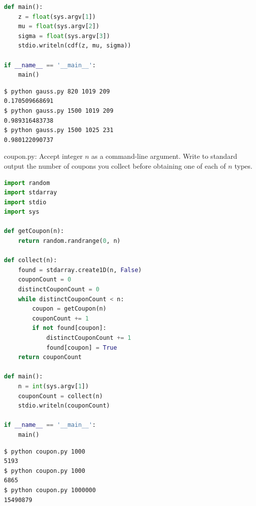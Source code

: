 \documentclass[8pt,a4paper,compress,handout]{beamer}
\begin{document}
\begin{frame}[fragile]
\begin{lstlisting}[language=Python]
def main():
    z = float(sys.argv[1])
    mu = float(sys.argv[2])
    sigma = float(sys.argv[3])
    stdio.writeln(cdf(z, mu, sigma))

if __name__ == '__main__':
    main()
\end{lstlisting}

\begin{lstlisting}[language={}]
$ python gauss.py 820 1019 209
0.170509668691
$ python gauss.py 1500 1019 209
0.989316483738
$ python gauss.py 1500 1025 231
0.980122090737
\end{lstlisting}
\end{frame}

\begin{frame}[fragile]
\begin{framed}
\tiny coupon.py: Accept integer $n$ as a command-line argument. Write to standard output the number of coupons you collect before obtaining one of each of $n$ types.
\end{framed}

\begin{lstlisting}[language=Python]
import random
import stdarray
import stdio
import sys

def getCoupon(n):
    return random.randrange(0, n)

def collect(n):
    found = stdarray.create1D(n, False)
    couponCount = 0
    distinctCouponCount = 0
    while distinctCouponCount < n:
        coupon = getCoupon(n)
        couponCount += 1
        if not found[coupon]:
            distinctCouponCount += 1
            found[coupon] = True
    return couponCount

def main():
    n = int(sys.argv[1])
    couponCount = collect(n)
    stdio.writeln(couponCount)

if __name__ == '__main__':
    main()
\end{lstlisting}
\end{frame}

\begin{frame}[fragile]
\begin{lstlisting}[language={}]
$ python coupon.py 1000
5193
$ python coupon.py 1000
6865
$ python coupon.py 1000000
15490879
\end{lstlisting}
\end{frame}
\end{document}
